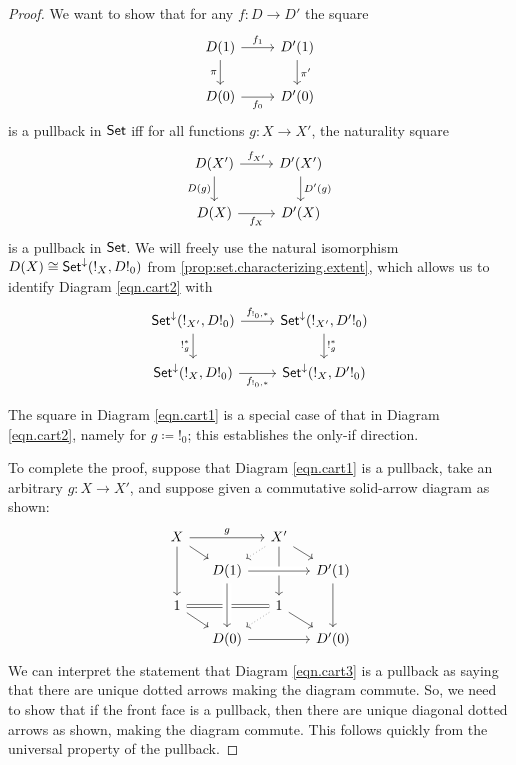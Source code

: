 \begin{proof}
We want to show that for any $f\colon D\to D'$ the square
\begin{equation}\label{eqn.cart1}
\begin{tikzcd}
	D(1)\ar[r, "f_1"]\ar[d, "\pi"']&
	D'(1)\ar[d, "\pi'"]\\
	D(0)\ar[r, "f_0"']&
	D'(0)
\end{tikzcd}
\end{equation}
is a pullback in $\operatorname{\mathsf{{Set}}}$ iff for all functions $g\colon X\to X'$, the naturality square
\begin{equation}\label{eqn.cart2}
\begin{tikzcd}
  D(X')\ar[r, "f_{X'}"]\ar[d, "D(g)"']&
  D'(X')\ar[d, "D'(g)"]\\
  D(X)\ar[r, "f_X"']&
  D'(X)
\end{tikzcd}
\end{equation}
is a pullback in $\operatorname{\mathsf{{Set}}}$. We will freely use the natural isomorphism
$D(X)\cong\operatorname{\mathsf{{Set}}}^{\mathbin{\downarrow}}(!_X, D!_0)$ from
\ref{prop:set.characterizing.extent}, which allows us to identify Diagram
\ref{eqn.cart2} with
\begin{equation}\label{eqn.cart3}
\begin{tikzcd}
 \Set^{\down}(!_{X'}, D!_0)     \ar[r, "f_{!_0,\ast}"]\ar[d, "!_g^{\ast}"']& \Set^{\down}(!_{X'}, D'!_0)
  \ar[d, "!_{g}^{\ast}"]\\
  \Set^{\down}(!_{X}, D!_0)\ar[r, "f_{!_0, \ast}"']&
 \Set^{\down}(!_X, D'!_0) 
\end{tikzcd}
\end{equation}

The square in Diagram \ref{eqn.cart1} is a
special case of that in Diagram \ref{eqn.cart2}, namely for $g\coloneqq !_0$;
this establishes the only-if direction. 

To complete the proof, suppose that Diagram \ref{eqn.cart1} is a pullback, take an arbitrary $g\colon X\to X'$, and suppose given a commutative solid-arrow diagram as shown:
\[
\begin{tikzcd}[sep=small]
  X\ar[rr, "g"]\ar[dd]\ar[rd]&&
  X'\ar[dr]\ar[dd]\ar[dl, dotted]\\&
  D(1)\ar[rr, crossing over]&&
  D'(1)\ar[dd]\\
  1\ar[dr]\ar[rr, equal]&&
  1\ar[dr]\ar[dl, dotted]\\&
  D(0)\ar[from=uu, crossing over]\ar[rr]&&
  D'(0)
\end{tikzcd}
\]
We can interpret the statement that Diagram \ref{eqn.cart3} is a pullback as
saying that there are unique dotted arrows making the diagram commute. So, we need to show that if the front face is a pullback, then there are unique diagonal dotted arrows as shown, making the diagram commute. This follows quickly from the universal property of the pullback.
\end{proof}


